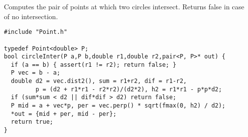 Computes the pair of points at which two circles intersect. Returns false in case of no intersection.
\begin{verbatim}
#include "Point.h"

typedef Point<double> P;
bool circleInter(P a,P b,double r1,double r2,pair<P, P>* out) {
  if (a == b) { assert(r1 != r2); return false; }
  P vec = b - a;
  double d2 = vec.dist2(), sum = r1+r2, dif = r1-r2,
         p = (d2 + r1*r1 - r2*r2)/(d2*2), h2 = r1*r1 - p*p*d2;
  if (sum*sum < d2 || dif*dif > d2) return false;
  P mid = a + vec*p, per = vec.perp() * sqrt(fmax(0, h2) / d2);
  *out = {mid + per, mid - per};
  return true;
}
\end{verbatim}

